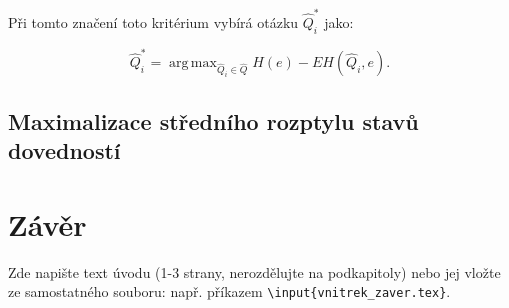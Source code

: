 \documentclass[a4paper,twoside,12pt]{book}
\DeclareMathOperator*{\argmax}{arg\,max}
\begin{document}
Při tomto značení toto kritérium vybírá otázku $\widehat{Q}^*_i$ jako:

\begin{equation}
	\widehat{Q}^*_i = \argmax_{\widehat{Q}_i \in \widehat{Q}} H(e) - EH(\widehat{Q}_i,e).
\end{equation}

\section{Maximalizace středního rozptylu stavů dovedností}





\chapter*{Závěr} %
%
Zde napište text úvodu (1-3 strany, nerozdělujte na podkapitoly) nebo jej vložte ze samostatného souboru: např. příkazem \texttt{\textbackslash input\{vnitrek\_zaver.tex\}}.
%
%


\clearpage  %
\end{document}
